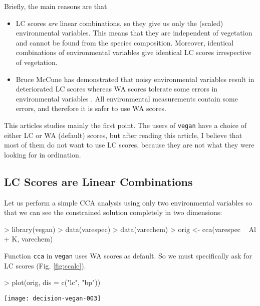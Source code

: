 \documentclass[a4paper,10pt]{amsart}
\begin{document}
Briefly, the main reasons are that
\begin{itemize}
\item
LC scores \emph{are} linear combinations, so they give us only the
(scaled) environmental variables. This means that they are
independent of vegetation and cannot be found from the species
composition.  Moreover, identical combinations of environmental
variables give identical LC scores irrespective of vegetation.
\item
Bruce McCune has demonstrated that noisy environmental variables
result in deteriorated LC scores whereas WA scores tolerate some errors
in environmental variables \cite{McCune97}.  All environmental
measurements contain some errors, and therefore it is safer to use WA
scores.
\end{itemize}
This articles studies mainly the first point.  The users of
\texttt{vegan} have a choice of either LC or WA (default) scores, but
after reading this article, I believe that most of them do not want to
use LC scores, because they are not what they were looking for in
ordination.

\subsection{LC Scores are Linear Combinations}

Let us perform a simple CCA analysis using only two environmental
variables so that we can see the constrained solution completely in
two dimensions:
\begin{Schunk}
\begin{Sinput}
> library(vegan)
> data(varespec)
> data(varechem)
> orig <- cca(varespec ~ Al + K, varechem)
\end{Sinput}
\end{Schunk}
Function \texttt{cca} in \texttt{vegan} uses WA scores as
default. So we must specifically ask for LC scores
(Fig. \ref{fig:ccalc}).
\begin{Schunk}
\begin{Sinput}
> plot(orig, dis = c("lc", "bp"))
\end{Sinput}
\end{Schunk}
\begin{SCfigure}
\texttt{[image: decision-vegan-003]}
\caption{LC scores in CCA of the original data.}
\label{fig:ccalc}
\end{SCfigure}
\end{document}
